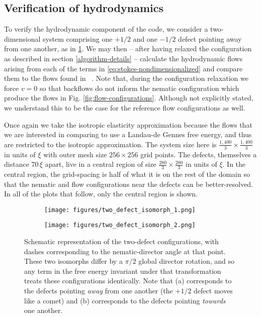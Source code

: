 \documentclass[reqno]{article}
\begin{document}
  \subsection{Verification of hydrodynamics} \label{verification-of-hydrodynamics}
  To verify the hydrodynamic component of the code, we consider a
  two-dimensional system comprising one
  $+1/2$ and one $-1/2$ defect pointing away from one another, as in
  \ref{fig:two-defect-isomorph-1}.
  We may then -- after having relaxed the configuration as described in
  section \ref{algorithm-details} --
  calculate the hydrodynamic flows arising from each of the terms in
  \eqref{eq:stokes-nondimensionalized} and compare them to the flows found in
  ~\cite{svensek_complex_2002}.
  Note that, during the configuration relaxation we force $v = 0$ so that
  backflows do not inform the nematic configuration which produce the flows in
  Fig. \ref{fig:flow-configurations}.
  Although not explicitly stated, we understand this to be the case for the
  reference flow configurations as well.
  
  Once again we take the isotropic elasticity approximation because the flows
  that we are interested in comparing to use a Landau-de Gennes free energy, and
  thus are restricted to the isotropic approximation.
  The system size here is $\frac{1,400}{3} \times \frac{1,400}{3}$ in units of
  $\xi$ with outer mesh size $256\times 256$ grid points.
  The defects, themselves a distance $70 \, \xi$ apart, live in a central region of
  size $\frac{280}{3} \times \frac{280}{3}$ in units of $\xi$.
  In the central region, the grid-spacing is half of what it is on the rest of
  the domain so that the nematic and flow configurations near the defects can be
  better-resolved.
  In all of the plots that follow, only the central region is shown.
  
  \begin{figure}[h]
    \centering
    \begin{subfigure}{0.45\textwidth}
      \texttt{[image: figures/two\_defect\_isomorph\_1.png]}
      \caption{}
      \label{fig:two-defect-isomorph-1}
    \end{subfigure}
    \hfill
    \begin{subfigure}{0.45\textwidth}
      \texttt{[image: figures/two\_defect\_isomorph\_2.png]}
      \caption{}
      \label{fig:two-defect-isomorph-2}
    \end{subfigure}
    \caption{Schematic representation of the two-defect configurations, with
      dashes corresponding to the nematic-director angle at that point. These
      two isomorphs differ by a $\pi/2$ global director rotation, and so any
      term in the free energy invariant under that transformation treats these
      configurations identically. Note that (a) corresponds to the defects
      pointing \textit{away} from one another (the $+1/2$ defect moves like a
      comet) and (b) corresponds to the defects pointing \textit{towards} one another.}
  \end{figure}
  
\end{document}
